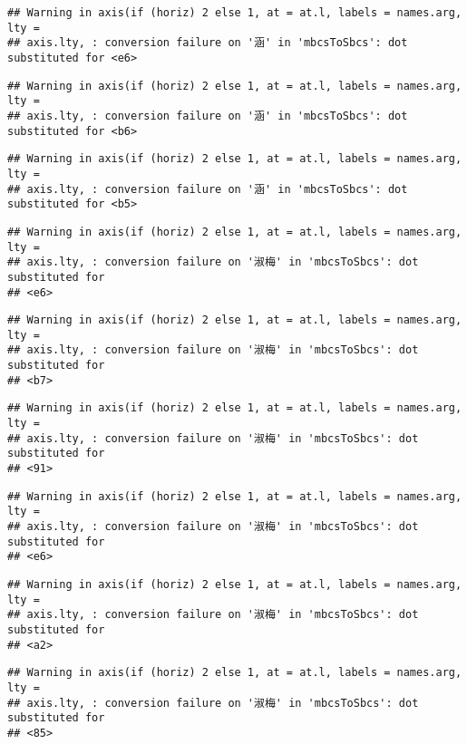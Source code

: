 \documentclass[
]{article}
\begin{document}
\begin{verbatim}
## Warning in axis(if (horiz) 2 else 1, at = at.l, labels = names.arg, lty =
## axis.lty, : conversion failure on '涵' in 'mbcsToSbcs': dot substituted for <e6>
\end{verbatim}

\begin{verbatim}
## Warning in axis(if (horiz) 2 else 1, at = at.l, labels = names.arg, lty =
## axis.lty, : conversion failure on '涵' in 'mbcsToSbcs': dot substituted for <b6>
\end{verbatim}

\begin{verbatim}
## Warning in axis(if (horiz) 2 else 1, at = at.l, labels = names.arg, lty =
## axis.lty, : conversion failure on '涵' in 'mbcsToSbcs': dot substituted for <b5>
\end{verbatim}

\begin{verbatim}
## Warning in axis(if (horiz) 2 else 1, at = at.l, labels = names.arg, lty =
## axis.lty, : conversion failure on '淑梅' in 'mbcsToSbcs': dot substituted for
## <e6>
\end{verbatim}

\begin{verbatim}
## Warning in axis(if (horiz) 2 else 1, at = at.l, labels = names.arg, lty =
## axis.lty, : conversion failure on '淑梅' in 'mbcsToSbcs': dot substituted for
## <b7>
\end{verbatim}

\begin{verbatim}
## Warning in axis(if (horiz) 2 else 1, at = at.l, labels = names.arg, lty =
## axis.lty, : conversion failure on '淑梅' in 'mbcsToSbcs': dot substituted for
## <91>
\end{verbatim}

\begin{verbatim}
## Warning in axis(if (horiz) 2 else 1, at = at.l, labels = names.arg, lty =
## axis.lty, : conversion failure on '淑梅' in 'mbcsToSbcs': dot substituted for
## <e6>
\end{verbatim}

\begin{verbatim}
## Warning in axis(if (horiz) 2 else 1, at = at.l, labels = names.arg, lty =
## axis.lty, : conversion failure on '淑梅' in 'mbcsToSbcs': dot substituted for
## <a2>
\end{verbatim}

\begin{verbatim}
## Warning in axis(if (horiz) 2 else 1, at = at.l, labels = names.arg, lty =
## axis.lty, : conversion failure on '淑梅' in 'mbcsToSbcs': dot substituted for
## <85>
\end{verbatim}
\end{document}
